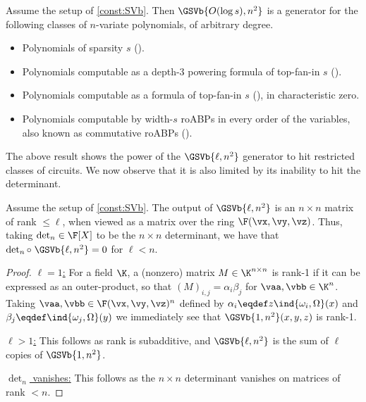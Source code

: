 \documentclass{toc}
\begin{document}
\begin{corollary}\label{res:SVb-gen}
        Assume the setup of \autoref{const:SVb}. Then $\GSVb{O(\log s),n^2}$ is a generator for the following classes of $n$-variate polynomials, of arbitrary degree.
        \begin{itemize}
                \item Polynomials of sparsity $s$ (\cite{ShpilkaVolkovich09,GurjarKST15,Forbes15}).
                \item Polynomials computable as a depth-$3$ powering formula of top-fan-in $s$ (\cite{AgrawalSS13,ForbesShpilka13a}).
                \item Polynomials computable as a \sumpowc formula of top-fan-in $s$ (\cite{Forbes15}), in characteristic zero.
                \item Polynomials computable by width-$s$ roABPs in every order of the variables, also known as commutative roABPs (\cite{AgrawalSS13,ForbesSS14}).
        \end{itemize}
\end{corollary}

The above result shows the power of the $\GSVb{\ell,n^2}$ generator to hit restricted classes of circuits.  We now observe that it is also limited by its inability to hit the determinant.

\begin{proposition}
        Assume the setup of \autoref{const:SVb}.  The output of $\GSVb{\ell,n^2}$ is an $n\times n$ matrix of rank $\le \ell$, when viewed as a matrix over the ring $\F(\vx,\vy,\vz)$.  Thus, taking $\det_n\in\F[X]$ to be the $n\times n$ determinant, we have that $\det_n\circ \;\GSVb{\ell,n^2}=0$ for $\ell<n$.
\end{proposition}
\begin{proof}
        \uline{$\ell=1$:} For a field $\K$, a (nonzero) matrix $M\in \K^{n\times n}$ is rank-1 if it can be expressed as an outer-product, so that $(M)_{i,j}=\alpha_i\beta_j$ for $\vaa,\vbb\in \K^n$.  Taking $\vaa,\vbb\in\F(\vx,\vy,\vz)^n$ defined by $\alpha_i\eqdef z\ind{\omega_i,\Omega}(x)$ and $\beta_j\eqdef\ind{\omega_j,\Omega}(y)$ we immediately see that $\GSVb{1,n^2}(x,y,z)$ is rank-1.

        \uline{$\ell>1$:} This follows as rank is subadditive, and $\GSVb{\ell,n^2}$ is the sum of $\ell$ copies of $\GSVb{1,n^2}$.

        \uline{$\det_n$ vanishes:} This follows as the $n\times n$ determinant vanishes on matrices of rank $<n$.
\end{proof}
\end{document}
